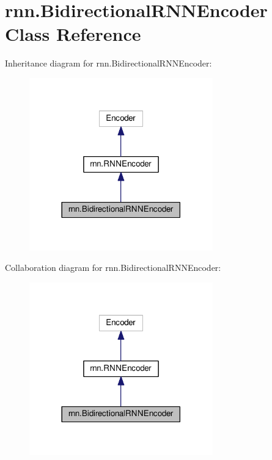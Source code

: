 \hypertarget{classrnn_1_1BidirectionalRNNEncoder}{}\section{rnn.\+Bidirectional\+R\+N\+N\+Encoder Class Reference}
\label{classrnn_1_1BidirectionalRNNEncoder}


Inheritance diagram for rnn.\+Bidirectional\+R\+N\+N\+Encoder\+:
\nopagebreak
\begin{figure}[H]
\begin{center}
\leavevmode
\includegraphics[width=225pt]{classrnn_1_1BidirectionalRNNEncoder__inherit__graph}
\end{center}
\end{figure}


Collaboration diagram for rnn.\+Bidirectional\+R\+N\+N\+Encoder\+:
\nopagebreak
\begin{figure}[H]
\begin{center}
\leavevmode
\includegraphics[width=225pt]{classrnn_1_1BidirectionalRNNEncoder__coll__graph}
\end{center}
\end{figure}
